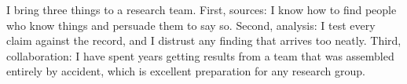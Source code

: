 
I bring three things to a research team. First, sources: I know how to find people who know things and persuade them to say so. Second, analysis: I test every claim against the record, and I distrust any finding that arrives too neatly. Third, collaboration: I have spent years getting results from a team that was assembled entirely by accident, which is excellent preparation for any research group.
